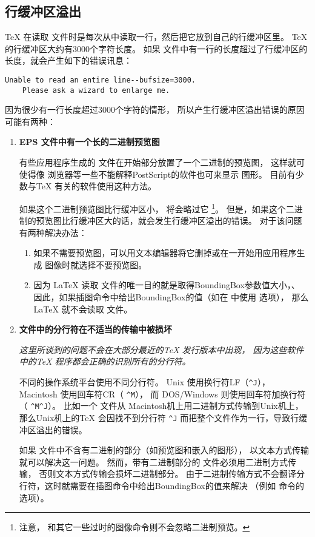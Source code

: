 \subsection{行缓冲区溢出}\label{ssec:linebuffer}

\TeX{} 在读取 \ascii 文件时是每次从中读取一行，然后把它放到自己的行缓冲区里。
\TeX{} 的行缓冲区大约有3000个字符长度。
如果  文件中有一行的长度超过了行缓冲区的长度，就会产生如下的错误讯息：

\begin{Verbatim}[xleftmargin=22pt]
	Unable to read an entire line--bufsize=3000.
	Please ask a wizard to enlarge me.
\end{Verbatim}

因为很少有一行长度超过3000个字符的情形，
所以产生行缓冲区溢出错误的原因可能有两种：

\begin{enumerate}
	\item \textbf{ EPS 文件中有一个长的二进制预览图}

	有些应用程序生成的 文件在开始部分放置了一个二进制的预览图，
	这样就可使得像 浏览器等一些不能解释PostScript的软件也可来显示  图形。
	目前有少数与\TeX{} 有关的软件使用这种方法。
	
	如果这个二进制预览图比行缓冲区小， 将会略过它
	\footnote{注意， 和其它一些过时的图像命令则不会忽略二进制预览。}。
	但是，如果这个二进制的预览图比行缓冲区大的话，就会发生行缓冲区溢出的错误。
	对于该问题有两种解决办法：
	
	\begin{enumerate}
		\item 如果不需要预览图，可以用文本编辑器将它删掉或在一开始用应用程序生成 图像时就选择不要预览图。
		\item 因为 \LaTeX{} 读取  文件的唯一目的就是取得BoundingBox参数值大小，、
		因此，如果插图命令中给出BoundingBox的值（如在  中使用  选项），
		那么\LaTeX{} 就不会读取  文件。
	\end{enumerate}
	
	\item \textbf{ 文件中的分行符在不适当的传输中被损坏}
	
	\emph{这里所谈到的问题不会在大部分最近的\TeX{} 发行版本中出现，
		因为这些软件中的\TeX{} 程序都会正确的识别所有的分行符。}
	
	不同的操作系统平台使用不同分行符。
	Unix 使用换行符LF（\verb+^J+），
	Macintosh 使用回车符CR（ \verb+^M+），
	而 DOS/Windows 则使用回车符加换行符（ \verb+^M^J+）。
	比如一个 文件从 Macintosh机上用二进制方式传输到Unix机上，
	那么Unix机上的\TeX{} 会因找不到分行符 \verb+^J+ 而把整个文件作为一行，导致行缓冲区溢出的错误。
	
	如果 文件中不含有二进制的部分（如预览图和嵌入的图形），
	以文本方式传输就可以解决这一问题。
	然而，带有二进制部分的  文件必须用二进制方式传输，
	否则文本方式传输会损坏二进制部分。
	由于二进制传输方式不会翻译分行符，这时就需要在插图命令中给出BoundingBox的值来解决
	（例如 命令的  选项）。
\end{enumerate}

